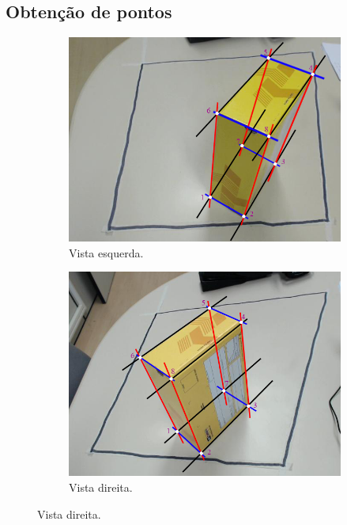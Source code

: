 \subsection{Obtenção de pontos}

\begin{figure}[H]
	\centering
	\begin{subfigure}[H]{0.49\textwidth}
		\includegraphics[width = \textwidth]{../../data/i7_L_axis.png}
		\caption{Vista esquerda.}
		\label{fig:i7_L_axis}
	\end{subfigure}
	\begin{subfigure}[H]{0.49\textwidth}
		\centering
		\includegraphics[width = \textwidth]{../../data/i7_R_axis.png}
		\caption{Vista direita.}
		\label{fig:i7_R_axis}
	\end{subfigure}
\end{figure}


